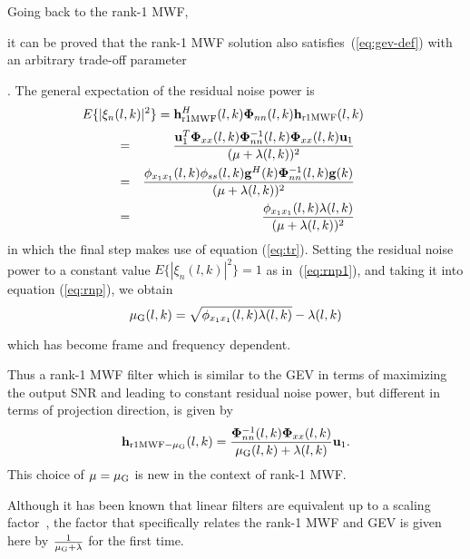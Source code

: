 \documentclass[review]{elsarticle}
\newif\ifproofread
\newcommand{\pfmarker}[1]{%
\ifproofread
\textcolor{red}{#1}%
\else
#1%
\fi
}
\newif\ifminorR
\newcommand{\pfminor}[1]{%
\ifminorR
\textcolor{red}{#1}%
\else
#1%
\fi
}
\begin{document}
Going back to the rank-1 MWF, \pfmarker{it can be proved that the rank-1 MWF solution also satisfies~(\ref{eq:gev-def}) with an arbitrary trade-off parameter}. The general expectation of the residual noise power is
\begin{displaymath}
E\{|\xi_n\pfmarker{(l,k)}|^2\}={\bf h}^H_{\text{r1MWF}}\pfmarker{(l,k)}{\bf \Phi}_{nn}\pfmarker{(l,k)}{\bf h}_{\text{r1MWF}}\pfmarker{(l,k)} \qquad
\end{displaymath}
\begin{eqnarray}\label{eq:rnp}
\nonumber &=& \frac{{\bf u}_{1}^T{\bf \Phi}_{xx}\pfmarker{(l,k)}{\bf \Phi}_{nn}^{-1}\pfmarker{(l,k)}{\bf \Phi}_{xx}\pfmarker{(l,k)}{\bf u}_{1}}{(\mu+\lambda\pfmarker{(l,k)})^2} \\
\nonumber   &=& \frac{\phi_{x_1x_1}\pfmarker{(l,k)}\phi_{ss}\pfmarker{(l,k)}{\bf g}^H\pfmarker{(k)}{\bf \Phi}_{nn}^{-1}\pfmarker{(l,k)}{\bf g}\pfmarker{(k)}}{(\mu+\lambda\pfmarker{(l,k)})^2} \\
   &=& \frac{\phi_{x_1x_1}\pfmarker{(l,k)}\lambda\pfmarker{(l,k)}}{(\mu+\lambda\pfmarker{(l,k)})^2}
\end{eqnarray}
in which the final step makes use of equation (\ref{eq:tr}). Setting the residual noise power to a constant value $E\{|\xi_n(l,k)|^2\} = 1$ as in~(\ref{eq:rnp1}), and taking it into equation (\ref{eq:rnp}), we obtain
\begin{equation}
  \mu_{\text G}\pfmarker{(l,k)} = \sqrt{\phi_{x_1x_1}\pfmarker{(l,k)}\lambda\pfmarker{(l,k)}} - \lambda\pfmarker{(l,k)}
\end{equation}
\pfminor{which has become frame and frequency dependent.} Thus a rank-1 MWF filter which is similar to the GEV in terms of maximizing the output SNR and leading to constant residual noise power, but different in terms of projection direction, is given by
\begin{equation}\label{eq:hgev}
  {\bf h}_{\text{r1MWF}-\mu_{\text{G}}}\pfmarker{(l,k)}=\frac{{\bf \Phi}_{nn}^{-1}\pfmarker{(l,k)}{\bf \Phi}_{xx}\pfmarker{(l,k)}}{\mu_{\text G}\pfmarker{(l,k)} + \lambda\pfmarker{(l,k)}}{\bf u}_{1}.
\end{equation}
This choice of $\mu=\mu_{\text G}$ is new in the context of rank-1 MWF. \pfmarker{Although it has been known that linear filters are equivalent up to a scaling factor~\cite{2016vsfilter,2013benestyNRtime,2016consolidated}, the factor that specifically relates the rank-1 MWF and GEV is given here by $\frac{1}{\mu_{\text G} + \lambda}$ for the first time.}
\end{document}
